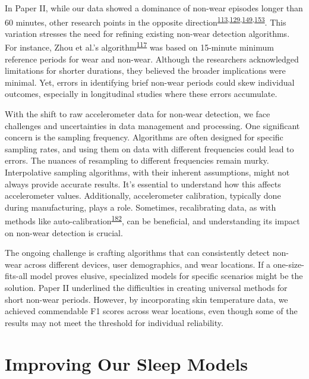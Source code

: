 \documentclass[
  10pt,
]{scrbook}
\begin{document}
In Paper II, while our data showed a dominance of non-wear episodes
longer than 60 minutes, other research points in the opposite
direction\textsuperscript{\protect\hyperlink{ref-aadland_comparison_2018}{113},\protect\hyperlink{ref-jaeschke_variability_2018}{129},\protect\hyperlink{ref-hutto_identifying_2013}{149},\protect\hyperlink{ref-vert_detecting_2022}{153}}.
This variation stresses the need for refining existing non-wear
detection algorithms. For instance, Zhou et al.'s
algorithm\textsuperscript{\protect\hyperlink{ref-zhou_classification_2015}{117}}
was based on 15-minute minimum reference periods for wear and non-wear.
Although the researchers acknowledged limitations for shorter durations,
they believed the broader implications were minimal. Yet, errors in
identifying brief non-wear periods could skew individual outcomes,
especially in longitudinal studies where these errors accumulate.

With the shift to raw accelerometer data for non-wear detection, we face
challenges and uncertainties in data management and processing. One
significant concern is the sampling frequency. Algorithms are often
designed for specific sampling rates, and using them on data with
different frequencies could lead to errors. The nuances of resampling to
different frequencies remain murky. Interpolative sampling algorithms,
with their inherent assumptions, might not always provide accurate
results. It's essential to understand how this affects accelerometer
values. Additionally, accelerometer calibration, typically done during
manufacturing, plays a role. Sometimes, recalibrating data, as with
methods like
auto-calibration\textsuperscript{\protect\hyperlink{ref-hees_2014}{182}},
can be beneficial, and understanding its impact on non-wear detection is
crucial.

The ongoing challenge is crafting algorithms that can consistently
detect non-wear across different devices, user demographics, and wear
locations. If a one-size-fits-all model proves elusive, specialized
models for specific scenarios might be the solution. Paper II underlined
the difficulties in creating universal methods for short non-wear
periods. However, by incorporating skin temperature data, we achieved
commendable F1 scores across wear locations, even though some of the
results may not meet the threshold for individual reliability.

\hypertarget{improving-our-sleep-models}{%
\section{Improving Our Sleep Models}\label{improving-our-sleep-models}}
\end{document}
